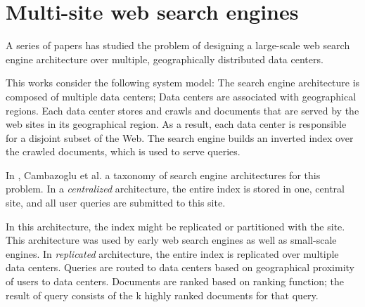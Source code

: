 



\section{Multi-site web search engines}
A series of papers \cite{cambazoglu:multisitequantifying, yates:multisitefeasibility, cambazoglu:multisiteforwarding, frances:multisiteefficiency, kayaaslan:multisitereplication}
has studied the problem of designing a large-scale web search engine architecture over multiple, geographically distributed data centers.

This works consider the following system model:
The search engine architecture is composed of multiple data centers; Data centers are associated with geographical regions.
Each data center stores and crawls and documents that are served by the web sites in its geographical region.
As a result, each data center is responsible for a disjoint subset of the Web.
The search engine builds an inverted index over the crawled documents, which is used to serve queries.

\medskip
\noindent
In \cite{cambazoglu:multisitequantifying}, Cambazoglu et al. a taxonomy of search engine architectures for this problem.
In a \textit{centralized} architecture, the entire index is stored in one, central site,
and all user queries are submitted to this site.

In this architecture, the index might be replicated or partitioned with the site.
This architecture was used by early web search engines as well as small-scale engines.
In \textit{replicated} architecture, the entire index is replicated over multiple data centers.
Queries are routed to data centers based on geographical proximity of users to data centers.
Documents are ranked based on ranking function; the result of query consists of the k highly ranked documents for that
query.

